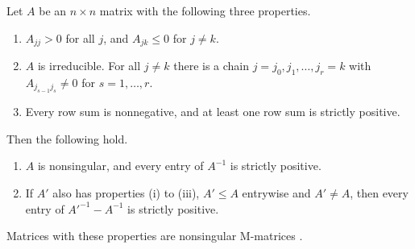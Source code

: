 \begin{lemma}[M-matrices]\label{lem:06-mmatrix}
Let $A$ be an $n\times n$ matrix with the following three properties.
\begin{enumerate}[label=(\roman*)]
\item $A_{jj} > 0$ for all $j$, and $A_{jk} \le 0$ for $j \ne k$.
\item $A$ is irreducible. For all $j \ne k$ there is a chain $j = j_0, j_1, \dots, j_r = k$ with
$A_{j_{s-1}j_s} \ne 0$ for $s = 1,\dots,r$.
\item Every row sum is nonnegative, and at least one row sum is strictly positive.
\end{enumerate}
Then the following hold.
\begin{enumerate}[label=(\alph*)]
\item $A$ is nonsingular, and every entry of $A^{-1}$ is strictly positive.
\item If $A'$ also has properties (i) to (iii), $A' \le A$ entrywise and $A' \ne A$, then every entry of
$A'^{-1} - A^{-1}$ is strictly positive.
\end{enumerate}
Matrices with these properties are nonsingular M-matrices \citep[ch.~6]{BermanPlemmons1994}.
\end{lemma}

